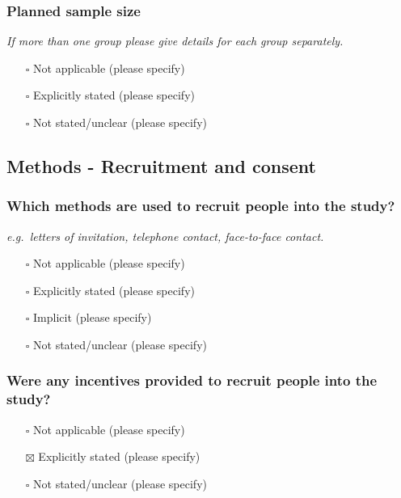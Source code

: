\documentclass[
  doc, a4paper]{apa7}
\providecommand{\tightlist}{%
  \setlength{\itemsep}{0pt}\setlength{\parskip}{0pt}}
\begin{document}
\subsubsection{Planned sample size}\label{planned-sample-size}

\emph{If more than one group please give details for each group separately.}

\begin{itemize}
\tightlist
\item[$\square$]
  Not applicable (please specify)
\item[$\square$]
  Explicitly stated (please specify)
\item[$\square$]
  Not stated/unclear (please specify)
\end{itemize}

\subsection{Methods - Recruitment and consent}\label{methods---recruitment-and-consent}

\subsubsection{Which methods are used to recruit people into the study?}\label{which-methods-are-used-to-recruit-people-into-the-study}

\emph{e.g.~letters of invitation, telephone contact, face-to-face contact.}

\begin{itemize}
\tightlist
\item[$\square$]
  Not applicable (please specify)
\item[$\square$]
  Explicitly stated (please specify)
\item[$\square$]
  Implicit (please specify)
\item[$\square$]
  Not stated/unclear (please specify)
\end{itemize}

\subsubsection{Were any incentives provided to recruit people into the study?}\label{were-any-incentives-provided-to-recruit-people-into-the-study}

\begin{itemize}
\tightlist
\item[$\square$]
  Not applicable (please specify)
\item[$\boxtimes$]
  Explicitly stated (please specify)
\item[$\square$]
  Not stated/unclear (please specify)
\end{itemize}
\end{document}
